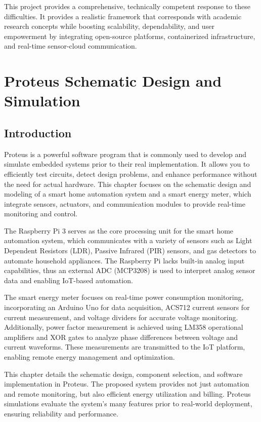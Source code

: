 \documentclass[a4paper,12pt]{report}
\begin{document}
This project provides a comprehensive, technically competent response to these difficulties.  It provides a realistic framework that corresponds with academic research concepts while boosting scalability, dependability, and user empowerment by integrating open-source platforms, containerized infrastructure, and real-time sensor-cloud communication.

\chapter{Proteus Schematic Design and Simulation}

\section{Introduction}
Proteus is a powerful software program that is commonly used to develop and simulate embedded systems prior to their real implementation.  It allows you to efficiently test circuits, detect design problems, and enhance performance without the need for actual hardware.  This chapter focuses on the schematic design and modeling of a smart home automation system and a smart energy meter, which integrate sensors, actuators, and communication modules to provide real-time monitoring and control.


The Raspberry Pi 3 serves as the core processing unit for the smart home automation system, which communicates with a variety of sensors such as Light Dependent Resistors (LDR), Passive Infrared (PIR) sensors, and gas detectors to automate household appliances.  The Raspberry Pi lacks built-in analog input capabilities, thus an external ADC (MCP3208) is used to interpret analog sensor data and enabling IoT-based automation\cite{valov2020home}.

The smart energy meter focuses on real-time power consumption monitoring, incorporating an Arduino Uno for data acquisition, ACS712 current sensors for current measurement, and voltage dividers for accurate voltage monitoring. Additionally, power factor measurement is achieved using LM358 operational amplifiers and XOR gates to analyze phase differences between voltage and current waveforms. These measurements are transmitted to the IoT platform, enabling remote energy management and optimization.

This chapter details the schematic design, component selection, and software implementation in Proteus.  The proposed system provides not just automation and remote monitoring, but also efficient energy utilization and billing.  Proteus simulations evaluate the system's many features prior to real-world deployment, ensuring reliability and performance.
\end{document}
